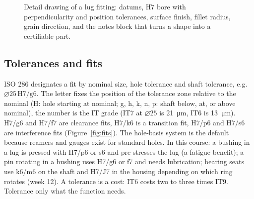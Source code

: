 \documentclass[11pt,a4paper]{article}
\begin{document}
\begin{figure}[H]
\caption{Detail drawing of a lug fitting: datums, H7 bore with perpendicularity and position tolerances, surface finish, fillet radius, grain direction, and the notes block that turns a shape into a certifiable part.}\label{fig:lug}
\end{figure}


\subsection{Tolerances and fits}
ISO 286 designates a fit by nominal size, hole tolerance and shaft tolerance, e.g.\ $\varnothing 25\,\mathrm{H7/g6}$. The letter fixes the position of the tolerance zone relative to the nominal (H: hole starting at nominal; g, h, k, n, p: shaft below, at, or above nominal), the number is the IT grade (IT7 at $\varnothing 25$ is \SI{21}{\micro m}, IT6 is \SI{13}{\micro m}). H7/g6 and H7/f7 are clearance fits, H7/k6 is a transition fit, H7/p6 and H7/s6 are interference fits (Figure~\ref{fig:fits}). The hole-basis system is the default because reamers and gauges exist for standard holes. In this course: a bushing in a lug is pressed with H7/p6 or s6 and pre-stresses the lug (a fatigue benefit); a pin rotating in a bushing uses H7/g6 or f7 and needs lubrication; bearing seats use k6/m6 on the shaft and H7/J7 in the housing depending on which ring rotates (week 12). A tolerance is a cost: IT6 costs two to three times IT9. Tolerance only what the function needs.
\end{document}
